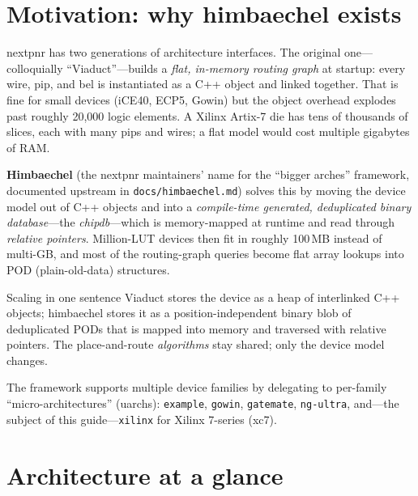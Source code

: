 \documentclass[11pt,a4paper]{article}
\begin{document}
\section{Motivation: why himbaechel exists}

nextpnr has two generations of architecture interfaces. The original
one---colloquially ``Viaduct''---builds a \emph{flat, in-memory routing
graph} at startup: every wire, pip, and bel is instantiated as a C++
object and linked together. That is fine for small devices (iCE40,
ECP5, Gowin) but the object overhead explodes past roughly 20{,}000
logic elements. A Xilinx Artix-7 die has tens of thousands of slices,
each with many pips and wires; a flat model would cost multiple
gigabytes of RAM.

\textbf{Himbaechel} (the nextpnr maintainers' name for the ``bigger
arches'' framework, documented upstream in \texttt{docs/himbaechel.md})
solves this by moving the device model out of C++ objects and into a
\emph{compile-time generated, deduplicated binary database}---the
\emph{chipdb}---which is memory-mapped at runtime and read through
\emph{relative pointers}. Million-LUT devices then fit in roughly
100\,MB instead of multi-GB, and most of the routing-graph queries
become flat array lookups into POD (plain-old-data) structures.

\begin{factbox}{Scaling in one sentence}
Viaduct stores the device as a heap of interlinked C++ objects; himbaechel
stores it as a position-independent binary blob of deduplicated PODs that
is mapped into memory and traversed with relative pointers. The
place-and-route \emph{algorithms} stay shared; only the device model
changes.
\end{factbox}

The framework supports multiple device families by delegating to
per-family ``micro-architectures'' (uarchs): \texttt{example},
\texttt{gowin}, \texttt{gatemate}, \texttt{ng-ultra}, and---the subject
of this guide---\texttt{xilinx} for Xilinx 7-series (xc7).

\section{Architecture at a glance}
\end{document}
